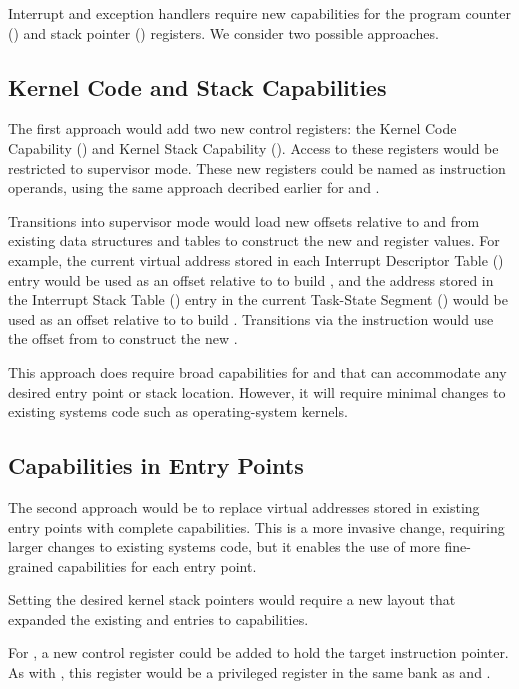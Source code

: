 Interrupt and exception handlers require new capabilities for the
program counter (\CIP{}) and stack pointer (\CSP{}) registers.  We consider
two possible approaches.

\subsection{Kernel Code and Stack Capabilities}

The first approach would add two new control registers: the Kernel
Code Capability (\KCC{}) and Kernel Stack Capability (\KSC{}).  Access to
these registers would be restricted to supervisor mode.  These new registers
could be named as instruction operands, using the same approach decribed
earlier for \CFS{} and \CGS{}.

Transitions into
supervisor mode would load new offsets relative to \KCC{} and \KSC{} from
existing data structures and tables to construct the new \CIP{} and \CSP{}
register values.  For example, the current virtual address stored in
each Interrupt Descriptor Table (\IDT{}) entry would be used as an offset
relative to \KCC{} to build \CIP{}, and the address stored in the Interrupt
Stack Table (\IST{}) entry in the current Task-State Segment (\TSS{}) would
be used as an offset relative to \KSC{} to build \CSP{}.  Transitions via
the  instruction would use the offset from \LSTAR{} to
construct the new \CIP{}.

This approach does require broad capabilities
for \KCC{} and \KSC{} that can accommodate any desired entry point or stack
location.  However, it will require minimal changes to existing systems
code such as operating-system kernels.

\subsection{Capabilities in Entry Points}

The second approach would be to replace virtual addresses stored in
existing entry points with complete capabilities.  This is a more
invasive change, requiring larger changes to existing systems code, but
it enables the use of more fine-grained capabilities for each entry
point.

Setting the desired kernel stack pointers \CSP{} would require a new
\TSS{} layout that expanded the existing \RSP{} and \IST{} entries to
capabilities.

For , a new control register \CSTAR{} could be
added to hold the target instruction pointer.  As with \KCC{},
this register would be a privileged register in the same bank as
\CFS{} and \CGS{}.

